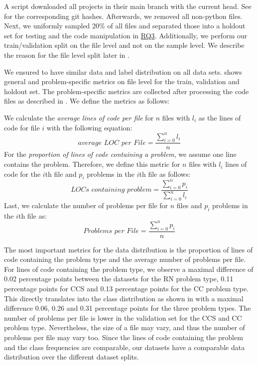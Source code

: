 A script downloaded all projects in their main branch with the current head. See  for the corresponding git hashes. Afterwards, we removed all non-python files. 
Next, we uniformly sampled 20\% of all files and separated those into a holdout set for testing and the code manipulation in \hyperref[rq:3]{RQ3}. Additionally, we perform our train/validation split on the file level and not on the sample level. We describe the reason for the file level split later in .

We ensured to have similar data and label distribution on all data sets.  shows general and problem-specific metrics on file level for the train, validation and holdout set. The problem-specific metrics are collected after processing the code files as described in . We define the metrics as follows:

We calculate the \textit{average lines of code per file} for $n$ files with $l_i$ as the lines of code for file $i$ with the following equation:
\[
  \textit{average LOC per File} = \frac{\sum_{i=0}^n{l_i}}{n}  
\]
For the \textit{proportion of lines of code containing a problem}, we assume one line contains the problem. Therefore, we define this metric for $n$ files with $l_i$ lines of code for the $i$th file and $p_i$ problems in the $i$th file as follows:
\[
    \textit{LOCs containing problem} = \frac{\sum_{i=0}^n{p_i}}{\sum_{i=0}^n{l_i}}
\]
Last, we calculate the number of problems per file for $n$ files and $p_i$ problems in the $i$th file as:
\[
    \textit{Problems per File} = \frac{\sum_{i=0}^n{p_i}}{n}
\]

The most important metrics for the data distribution is the proportion of lines of code containing the problem type and the average number of problems per file. For lines of code containing the problem type, we observe a maximal difference of 0.02 percentage points between the datasets for the RN problem type, 0.11 percentage points for CCS and 0.13 percentage points for the CC problem type. This directly translates into the class distribution as shown in  with a maximal difference 0.06, 0.26 and 0.31 percentage points for the three problem types.
The number of problems per file is lower in the validation set for the CCS and CC problem type. Nevertheless, the size of a file may vary, and thus the number of problems per file may vary too. Since the lines of code containing the problem and the class frequencies are comparable, our datasets have a comparable data distribution over the different dataset splits.


